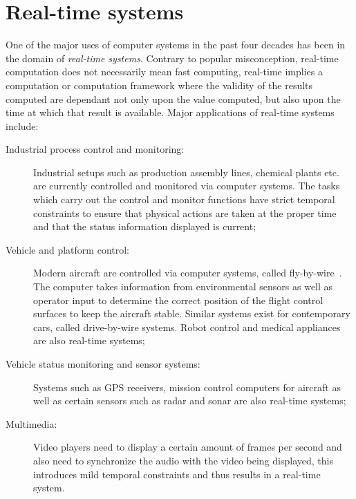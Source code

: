 \section{Real-time systems}
One of the major uses of computer systems in the past four decades
has been in the domain of \emph{real-time systems}.  Contrary to
popular misconception, real-time computation does not necessarily mean
fast computing, real-time implies a computation or computation
framework where the validity of the results computed are dependant not
only upon the value computed, but also upon the time at which that
result is available. Major applications of real-time systems
include:

\begin{description}
\item[Industrial process control and monitoring:]{Industrial setups
  such as production assembly lines, chemical plants etc. are
  currently controlled and monitored via computer systems. The tasks
  which carry out the control and monitor functions have strict
  temporal constraints to ensure that physical actions are taken at
  the proper time and that the status information displayed is current;}
\item[Vehicle and platform control:]{Modern aircraft are controlled
  via computer systems, called fly-by-wire~\cite{langer@rtsep92}. The
  computer takes information from environmental sensors as well as
  operator input to determine the correct position of the flight
  control surfaces to keep the aircraft stable. Similar systems exist
  for contemporary cars, called drive-by-wire systems. Robot control
  and medical appliances are also real-time systems;}
\item[Vehicle status monitoring and sensor systems:]{Systems such as GPS
  receivers, mission control computers for aircraft as well as certain
  sensors such as radar and sonar are also real-time systems;}
\item[Multimedia:]{Video players need to display a certain amount of
  frames per second and also need to synchronize the audio with the
  video being displayed, this introduces mild temporal constraints and
  thus results in a real-time system.}
\end{description}

